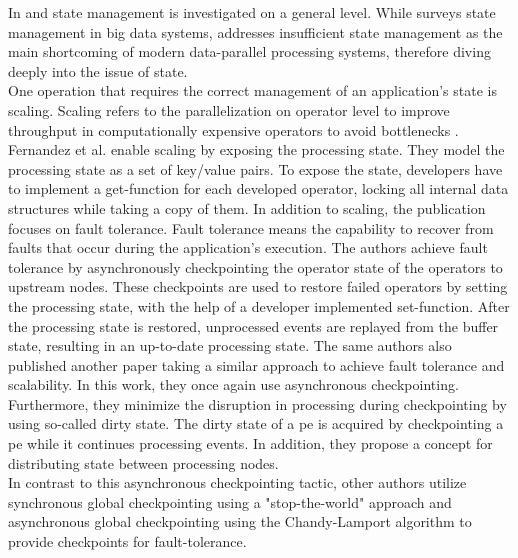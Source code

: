 In \cite{CastroFernandez.2016} and \cite{To.2017} state management is investigated on a general level. While \cite{To.2017} surveys state management in big data systems, \cite{CastroFernandez.2016} addresses insufficient state management as the main shortcoming of modern data-parallel processing systems, therefore diving deeply into the issue of state.\\
One operation that requires the correct management of an application's state is scaling. Scaling refers to the parallelization on operator level to improve throughput in computationally expensive operators to avoid bottlenecks \cite{CastroFernandez.2013}. Fernandez et al. \cite{CastroFernandez.2013} enable scaling by exposing the processing state. They model the processing state as a set of key/value pairs. To expose the state, developers have to implement a get-function for each developed operator, locking all internal data structures while taking a copy of them. In addition to scaling, the publication focuses on fault tolerance. Fault tolerance means the capability to recover from faults that occur during the application's execution. The authors achieve fault tolerance by asynchronously checkpointing the operator state of the operators to upstream nodes. These checkpoints are used to restore failed operators by setting the processing state, with the help of a developer implemented set-function. After the processing state is restored, unprocessed events are replayed from the buffer state, resulting in an up-to-date processing state. The same authors also published another paper \cite{Gibson.2014} taking a similar approach to achieve fault tolerance and scalability. In this work, they once again use asynchronous checkpointing. Furthermore, they minimize the disruption in processing during checkpointing by using so-called dirty state. The dirty state of a \gls{pe} is acquired by checkpointing a \gls{pe} while it continues processing events. In addition, they propose a concept for distributing state between processing nodes.\\
In contrast to this asynchronous checkpointing tactic, other authors utilize synchronous global checkpointing using a "stop-the-world" approach \cite{Murray.2013} and asynchronous global checkpointing using the Chandy-Lamport algorithm \cite{Chandy.1985, Power.2010} to provide checkpoints for fault-tolerance.\\
